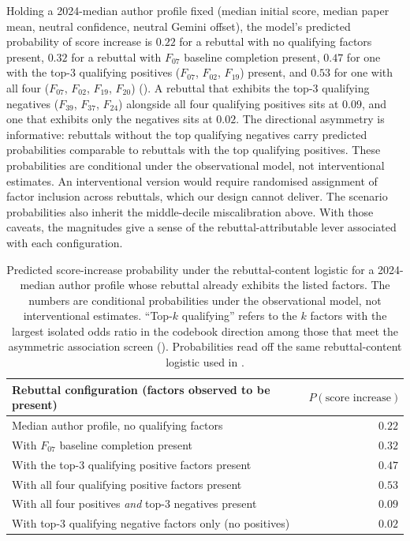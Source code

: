 \documentclass{article}
\begin{document}
Holding a 2024-median author profile fixed (median initial score, median paper mean, neutral confidence, neutral Gemini offset), the model's predicted probability of score increase is $0.22$ for a rebuttal with no qualifying factors present, $0.32$ for a rebuttal with $F_{07}$ baseline completion present, $0.47$ for one with the top-3 qualifying positives ($F_{07}$, $F_{02}$, $F_{19}$) present, and $0.53$ for one with all four ($F_{07}$, $F_{02}$, $F_{19}$, $F_{20}$) (). A rebuttal that exhibits the top-3 qualifying negatives ($F_{39}$, $F_{37}$, $F_{24}$) alongside all four qualifying positives sits at $0.09$, and one that exhibits only the negatives sits at $0.02$. The directional asymmetry is informative: rebuttals without the top qualifying negatives carry predicted probabilities comparable to rebuttals with the top qualifying positives. These probabilities are conditional under the observational model, not interventional estimates. An interventional version would require randomised assignment of factor inclusion across rebuttals, which our design cannot deliver. The scenario probabilities also inherit the middle-decile miscalibration above. With those caveats, the magnitudes give a sense of the rebuttal-attributable lever associated with each configuration.

\begin{table}[t]
  \centering
  \caption{Predicted score-increase probability under the rebuttal-content logistic for a 2024-median author profile whose rebuttal already exhibits the listed factors. The numbers are conditional probabilities under the observational model, not interventional estimates. ``Top-$k$ qualifying'' refers to the $k$ factors with the largest isolated odds ratio in the codebook direction among those that meet the asymmetric association screen (). Probabilities read off the same rebuttal-content logistic used in .}
  \label{tab:scenarios}
  \small
  \begin{tabular}{lr}
    \toprule
    Rebuttal configuration (factors observed to be present) & $P(\text{score increase})$ \\
    \midrule
    Median author profile, no qualifying factors                                       & $0.22$ \\
    With $F_{07}$ baseline completion present                                          & $0.32$ \\
    With the top-3 qualifying positive factors present                                 & $0.47$ \\
    With all four qualifying positive factors present                                  & $0.53$ \\
    With all four positives \emph{and} top-3 negatives present                         & $0.09$ \\
    With top-3 qualifying negative factors only (no positives)                         & $0.02$ \\
    \bottomrule
  \end{tabular}
\end{table}
\end{document}
